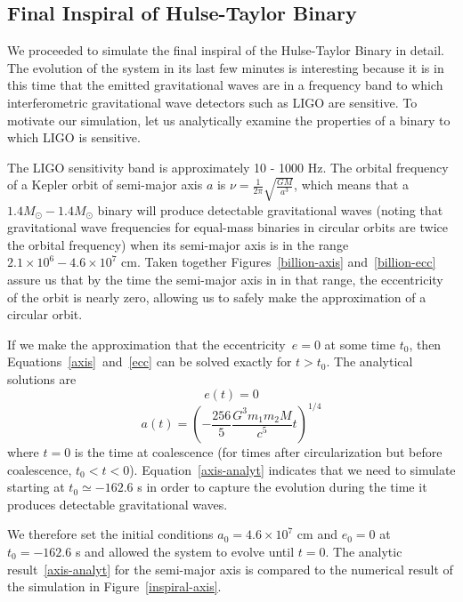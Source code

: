 \documentclass[preprint2]{aastex}
\begin{document}
\subsection{Final Inspiral of Hulse-Taylor Binary}

We proceeded to simulate the final inspiral of the Hulse-Taylor Binary in detail. The evolution of the system in its last few minutes is interesting because it is in this time that the emitted gravitational waves are in a frequency band to which interferometric gravitational wave detectors such as LIGO are sensitive. To motivate our simulation, let us analytically examine the properties of a binary to which LIGO is sensitive.

The LIGO sensitivity band is approximately 10 - 1000 Hz. The orbital frequency of a Kepler orbit of semi-major axis \(a\) is \(\nu = \frac{1}{2 \pi} \sqrt{\frac{GM}{a^3}}\), which means that a \(1.4 M_\odot - 1.4 M_\odot\) binary will produce detectable gravitational waves (noting that gravitational wave frequencies for equal-mass binaries in circular orbits are twice the orbital frequency) when its semi-major axis is in the range \(2.1 \times 10^6 - 4.6 \times 10^7\) cm. Taken together Figures~\ref{billion-axis} and~\ref{billion-ecc} assure us that by the time the semi-major axis in in that range, the eccentricity of the orbit is nearly zero, allowing us to safely make the approximation of a circular orbit.

If we make the approximation that the eccentricity~\(e = 0\) at some time \(t_0\), then Equations~\eqref{axis}~and~\eqref{ecc} can be solved exactly for \(t > t_0\). The analytical solutions are
\[ e(t) = 0 \]
\begin{equation} \label{axis-analyt}
a(t) = \left( - \frac{256}{5} \frac{G^3 m_1 m_2 M}{c^5} t \right)^{1/4}
\end{equation}
where \(t = 0\) is the time at coalescence (for times after circularization but before coalescence, \(t_0 < t < 0\)). Equation~\eqref{axis-analyt} indicates that we need to simulate starting at \(t_0 \simeq -162.6\) s in order to capture the evolution during the time it produces detectable gravitational waves.

We therefore set the initial conditions \(a_0 = 4.6 \times 10^7\) cm and \(e_0 = 0\) at \(t_0 = -162.6\) s and allowed the system to evolve until \(t = 0\).  The analytic result~\eqref{axis-analyt} for the semi-major axis is compared to the numerical result of the simulation in Figure~\ref{inspiral-axis}.
\end{document}
